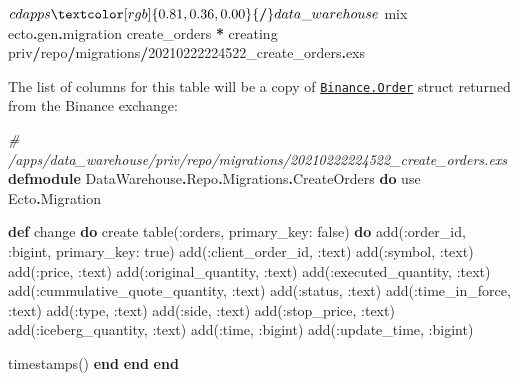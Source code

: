 \documentclass[
]{book}
\newenvironment{Shaded}{\begin{snugshade}}{\end{snugshade}}
\newcommand{\CommentTok}[1]{\textcolor[rgb]{0.56,0.35,0.01}{\textit{#1}}}
\newcommand{\ConstantTok}[1]{\textcolor[rgb]{0.00,0.00,0.00}{#1}}
\newcommand{\DecValTok}[1]{\textcolor[rgb]{0.00,0.00,0.81}{#1}}
\newcommand{\ImportTok}[1]{#1}
\newcommand{\KeywordTok}[1]{\textcolor[rgb]{0.13,0.29,0.53}{\textbf{#1}}}
\newcommand{\NormalTok}[1]{#1}
\newcommand{\OperatorTok}[1]{\textcolor[rgb]{0.81,0.36,0.00}{\textbf{#1}}}
\newcommand{\VariableTok}[1]{\textcolor[rgb]{0.00,0.00,0.00}{#1}}
\begin{document}
\begin{Shaded}
\begin{Highlighting}[]
\NormalTok{$ cd apps}\OperatorTok{/}\NormalTok{data\_warehouse}
\NormalTok{$ mix ecto}\OperatorTok{.}\NormalTok{gen}\OperatorTok{.}\NormalTok{migration create\_orders}
\OperatorTok{*}\NormalTok{ creating priv}\OperatorTok{/}\NormalTok{repo}\OperatorTok{/}\NormalTok{migrations}\OperatorTok{/}\DecValTok{2}\NormalTok{0210222224522\_create\_orders}\OperatorTok{.}\NormalTok{exs}
\end{Highlighting}
\end{Shaded}

The list of columns for this table will be a copy of \href{https://github.com/dvcrn/binance.ex/blob/master/lib/binance/order.ex}{\texttt{Binance.Order}} struct returned from the Binance exchange:

\begin{Shaded}
\begin{Highlighting}[]
\CommentTok{\# /apps/data\_warehouse/priv/repo/migrations/20210222224522\_create\_orders.exs}
\KeywordTok{defmodule} \ConstantTok{DataWarehouse}\OperatorTok{.}\ConstantTok{Repo}\OperatorTok{.}\ConstantTok{Migrations}\OperatorTok{.}\ConstantTok{CreateOrders} \KeywordTok{do}
  \ImportTok{use} \ConstantTok{Ecto}\OperatorTok{.}\ConstantTok{Migration}

  \KeywordTok{def}\NormalTok{ change }\KeywordTok{do}
\NormalTok{    create table(}\VariableTok{:orders}\NormalTok{, }\VariableTok{primary\_key:} \ConstantTok{false}\NormalTok{) }\KeywordTok{do}
\NormalTok{      add(}\VariableTok{:order\_id}\NormalTok{, }\VariableTok{:bigint}\NormalTok{, }\VariableTok{primary\_key:} \ConstantTok{true}\NormalTok{)}
\NormalTok{      add(}\VariableTok{:client\_order\_id}\NormalTok{, }\VariableTok{:text}\NormalTok{)}
\NormalTok{      add(}\VariableTok{:symbol}\NormalTok{, }\VariableTok{:text}\NormalTok{)}
\NormalTok{      add(}\VariableTok{:price}\NormalTok{, }\VariableTok{:text}\NormalTok{)}
\NormalTok{      add(}\VariableTok{:original\_quantity}\NormalTok{, }\VariableTok{:text}\NormalTok{)}
\NormalTok{      add(}\VariableTok{:executed\_quantity}\NormalTok{, }\VariableTok{:text}\NormalTok{)}
\NormalTok{      add(}\VariableTok{:cummulative\_quote\_quantity}\NormalTok{, }\VariableTok{:text}\NormalTok{)}
\NormalTok{      add(}\VariableTok{:status}\NormalTok{, }\VariableTok{:text}\NormalTok{)}
\NormalTok{      add(}\VariableTok{:time\_in\_force}\NormalTok{, }\VariableTok{:text}\NormalTok{)}
\NormalTok{      add(}\VariableTok{:type}\NormalTok{, }\VariableTok{:text}\NormalTok{)}
\NormalTok{      add(}\VariableTok{:side}\NormalTok{, }\VariableTok{:text}\NormalTok{)}
\NormalTok{      add(}\VariableTok{:stop\_price}\NormalTok{, }\VariableTok{:text}\NormalTok{)}
\NormalTok{      add(}\VariableTok{:iceberg\_quantity}\NormalTok{, }\VariableTok{:text}\NormalTok{)}
\NormalTok{      add(}\VariableTok{:time}\NormalTok{, }\VariableTok{:bigint}\NormalTok{)}
\NormalTok{      add(}\VariableTok{:update\_time}\NormalTok{, }\VariableTok{:bigint}\NormalTok{)}

\NormalTok{      timestamps()}
    \KeywordTok{end}
  \KeywordTok{end}
\KeywordTok{end}
\end{Highlighting}
\end{Shaded}
\end{document}

